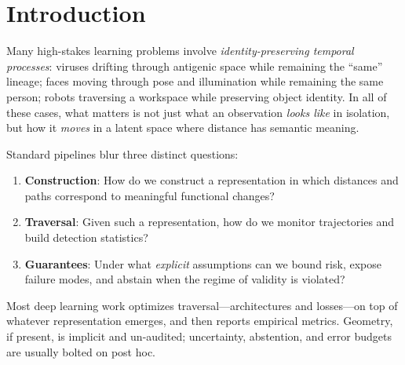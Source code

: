 \documentclass[11pt]{article}
\theoremstyle{remark}
\theoremstyle{plain}
\begin{document}
\begin{abstract}
\emph{Scope}: This manuscript is conceptual. It states definitions, assumptions, theorems,
and proposed empirical protocols (including distortion audits, error-budget estimation,
and abstention monitoring) but does not report retrospective or prospective performance
metrics.

\emph{Second edition}: This edition repairs five steps of the 2025 text (the InfoNCE lemma, the
smoothness--distortion proposition, the margin-to-separation proposition, one step of the main bound,
and the vacuity corollary), replaces three different non-vacuity conditions with one, and adds a
first exact instance (Section~\ref{sec:exact-instance}): a spectral floor certificate on the Berger
spheres that has the shape of a fully certified Davis system. The bridge to that instance is structural;
no single theorem of which both are instances is claimed. The deterministic steps are machine-checked
in Lean. Appendix~D lists every change. Within this scope, Davis manifolds provide a unifying geometric foundation for
identity-preserving temporal detection with explicit regimes of validity, abstention as a
first-class behavior, and compositional error budgets that make failures legible and
falsifiable.
\end{abstract}

\section{Introduction}
\label{sec:intro}

Many high-stakes learning problems involve \emph{identity-preserving temporal processes}: viruses drifting through antigenic space while remaining the ``same'' lineage; faces moving through pose and illumination while remaining the same person; robots traversing a workspace while preserving object identity. In all of these cases, what matters is not just what an observation \emph{looks like} in isolation, but how it \emph{moves} in a latent space where distance has semantic meaning.

Standard pipelines blur three distinct questions:
\begin{enumerate}[leftmargin=*]
    \item \textbf{Construction}: How do we construct a representation in which distances and paths correspond to meaningful functional changes?
    \item \textbf{Traversal}: Given such a representation, how do we monitor trajectories and build detection statistics?
    \item \textbf{Guarantees}: Under what \emph{explicit} assumptions can we bound risk, expose failure modes, and abstain when the regime of validity is violated?
\end{enumerate}
Most deep learning work optimizes traversal---architectures and losses---on top of whatever representation emerges, and then reports empirical metrics. Geometry, if present, is implicit and un-audited; uncertainty, abstention, and error budgets are usually bolted on post hoc.
\end{document}
